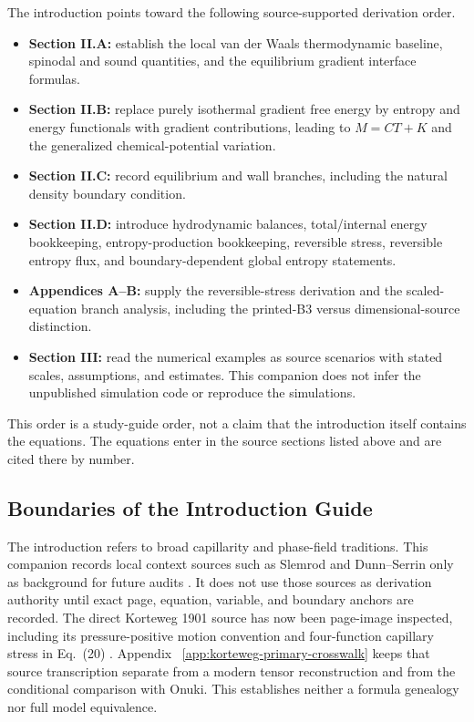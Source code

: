 The introduction points toward the following source-supported derivation order.

\begin{itemize}
\item \textbf{Section II.A:} establish the local van der Waals thermodynamic
  baseline, spinodal and sound quantities, and the equilibrium gradient
  interface formulas.
\item \textbf{Section II.B:} replace purely isothermal gradient free energy by
  entropy and energy functionals with gradient contributions, leading to
  \(M=CT+K\) and the generalized chemical-potential variation.
\item \textbf{Section II.C:} record equilibrium and wall branches, including
  the natural density boundary condition.
\item \textbf{Section II.D:} introduce hydrodynamic balances, total/internal
  energy bookkeeping, entropy-production bookkeeping, reversible stress,
  reversible entropy flux, and boundary-dependent global entropy statements.
\item \textbf{Appendices A--B:} supply the reversible-stress derivation and the
  scaled-equation branch analysis, including the printed-B3 versus
  dimensional-source distinction.
\item \textbf{Section III:} read the numerical examples as source scenarios with
  stated scales, assumptions, and estimates.  This companion does not infer the
  unpublished simulation code or reproduce the simulations.
\end{itemize}

This order is a study-guide order, not a claim that the introduction itself
contains the equations.  The equations enter in the source sections listed
above and are cited there by number.

\subsection{Boundaries of the Introduction Guide}

The introduction refers to broad capillarity and phase-field traditions.  This
companion records local context sources such as Slemrod and
Dunn--Serrin only as background for future audits
\citep{Slemrod1983VanDerWaalsPhaseBoundaries,DunnSerrin1985}.  It does not use
those sources as derivation authority until exact page, equation, variable, and
boundary anchors are recorded.  The direct Korteweg 1901 source has now been
page-image inspected, including its pressure-positive motion convention and
four-function capillary stress in Eq.~(20) \citep{Korteweg1901}.  Appendix~
\ref{app:korteweg-primary-crosswalk} keeps that source transcription separate
from a modern tensor reconstruction and from the conditional comparison with
Onuki.  This establishes neither a formula genealogy nor full model
equivalence.

